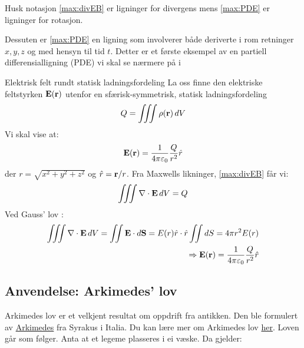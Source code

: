 \begin{rem}{}
Husk notasjon \eqref{max:divEB} er ligninger for divergens mens \eqref{max:PDE} er ligninger for rotasjon.

Dessuten er \eqref{max:PDE} en ligning som involverer både deriverte i rom retninger $x,y,z$ og med hensyn til tid $t$. Detter er et første eksempel av en partiell differensialligning (PDE) vi skal se nærmere på i 
\end{rem}
\begin{eks}{Elektrisk felt rundt statisk ladningsfordeling}
La oss finne den elektriske feltstyrken \( \mathbf{E}(\mathbf{r}) \) utenfor en sfærisk-symmetrisk, statisk ladningsfordeling 
\[
Q = \iiint \rho(\mathbf{r})\, dV
\]
Vi skal vise at:
\[
\mathbf{E}(\mathbf{r}) = \frac{1}{4 \pi \varepsilon_0} \frac{Q}{r^2} \hat{r}
\]
der \( r = \sqrt{x^2 + y^2 + z^2} \) og \( \hat{r} = \mathbf{r}/r \).
Fra Maxwells likninger, \eqref{max:divEB} får vi:
\[
\iiint \nabla \cdot \mathbf{E}\, dV = Q
\]
Ved Gauss’ lov :
\begin{align*}
\iiint \nabla \cdot \mathbf{E}\, dV = \iint \mathbf{E} \cdot d\mathbf{S} = E(r) \hat{r} \cdot \hat{r} \iint dS = 4\pi r^2 E(r)
\\
\Rightarrow \mathbf{E}(\mathbf{r}) = \frac{1}{4 \pi \varepsilon_0} \frac{Q}{r^2} \hat{r}
\end{align*}
\end{eks}

%
\subsection{Anvendelse: Arkimedes' lov}
Arkimedes lov er et velkjent resultat om oppdrift fra antikken. Den ble formulert av \href{https://no.wikipedia.org/wiki/Arkimedes}{Arkimedes} fra Syrakus i Italia. Du kan lære mer om Arkimedes lov \href{https://www.youtube.com/watch?v=euvIlejovCA&list=PLBSPq-MdQqruVxoeYU6tAZ9t-kDUXXhoE&index=6}{her}. Loven går som følger. Anta at et legeme plasseres i ei væske. Da gjelder:

